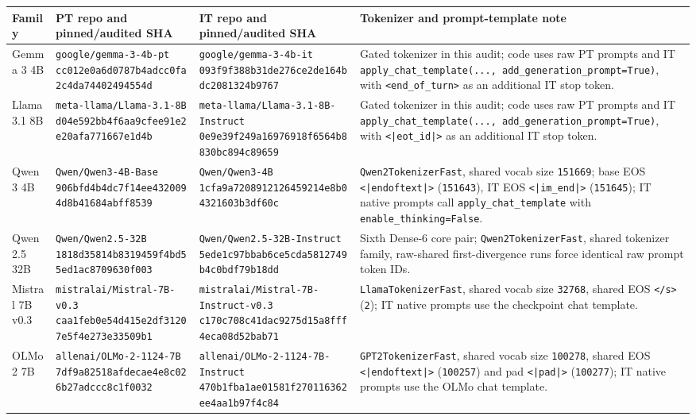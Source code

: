 \documentclass[11pt]{article}
\begin{document}
\begin{table}[t]
\centering
\small
\setlength{\tabcolsep}{3pt}
\begin{tabularx}{\linewidth}{@{}>{\raggedright\arraybackslash}X >{\raggedright\arraybackslash}X >{\raggedright\arraybackslash}X >{\raggedright\arraybackslash}X@{}}
\toprule
Family & PT repo and pinned/audited SHA & IT repo and pinned/audited SHA & Tokenizer and prompt-template note \\
\midrule
Gemma 3 4B & \texttt{google/gemma-3-4b-pt} \texttt{cc012e0a6d0787b4adcc0fa2c4da74402494554d} & \texttt{google/gemma-3-4b-it} \texttt{093f9f388b31de276ce2de164bdc2081324b9767} & Gated tokenizer in this audit; code uses raw PT prompts and IT \texttt{apply\_chat\_template(..., add\_generation\_prompt=True)}, with \texttt{<end\_of\_turn>} as an additional IT stop token. \\
Llama 3.1 8B & \texttt{meta-llama/Llama-3.1-8B} \texttt{d04e592bb4f6aa9cfee91e2e20afa771667e1d4b} & \texttt{meta-llama/Llama-3.1-8B-Instruct} \texttt{0e9e39f249a16976918f6564b8830bc894c89659} & Gated tokenizer in this audit; code uses raw PT prompts and IT \texttt{apply\_chat\_template(..., add\_generation\_prompt=True)}, with \texttt{<|eot\_id|>} as an additional IT stop token. \\
Qwen 3 4B & \texttt{Qwen/Qwen3-4B-Base} \texttt{906bfd4b4dc7f14ee4320094d8b41684abff8539} & \texttt{Qwen/Qwen3-4B} \texttt{1cfa9a7208912126459214e8b04321603b3df60c} & \texttt{Qwen2TokenizerFast}, shared vocab size \texttt{151669}; base EOS \texttt{<|endoftext|>} (\texttt{151643}), IT EOS \texttt{<|im\_end|>} (\texttt{151645}); IT native prompts call \texttt{apply\_chat\_template} with \texttt{enable\_thinking=False}. \\
Qwen2.5 32B & \texttt{Qwen/Qwen2.5-32B} \texttt{1818d35814b8319459f4bd55ed1ac8709630f003} & \texttt{Qwen/Qwen2.5-32B-Instruct} \texttt{5ede1c97bbab6ce5cda5812749b4c0bdf79b18dd} & Sixth Dense-6 core pair; \texttt{Qwen2TokenizerFast}, shared tokenizer family, raw-shared first-divergence runs force identical raw prompt token IDs. \\
Mistral 7B v0.3 & \texttt{mistralai/Mistral-7B-v0.3} \texttt{caa1feb0e54d415e2df31207e5f4e273e33509b1} & \texttt{mistralai/Mistral-7B-Instruct-v0.3} \texttt{c170c708c41dac9275d15a8fff4eca08d52bab71} & \texttt{LlamaTokenizerFast}, shared vocab size \texttt{32768}, shared EOS \texttt{</s>} (\texttt{2}); IT native prompts use the checkpoint chat template. \\
OLMo 2 7B & \texttt{allenai/OLMo-2-1124-7B} \texttt{7df9a82518afdecae4e8c026b27adccc8c1f0032} & \texttt{allenai/OLMo-2-1124-7B-Instruct} \texttt{470b1fba1ae01581f270116362ee4aa1b97f4c84} & \texttt{GPT2TokenizerFast}, shared vocab size \texttt{100278}, shared EOS \texttt{<|endoftext|>} (\texttt{100257}) and pad \texttt{<|pad|>} (\texttt{100277}); IT native prompts use the OLMo chat template. \\

\end{tabularx}
\end{table}
\end{document}
